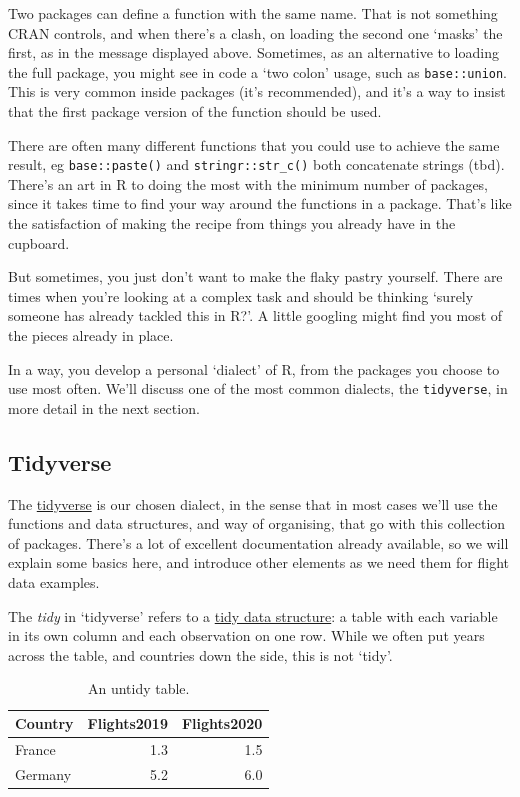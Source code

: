 \documentclass[
]{book}
\begin{document}
Two packages can define a function with the same name. That is not something CRAN controls, and when there's a clash, on loading the second one `masks' the first, as in the message displayed above. Sometimes, as an alternative to loading the full package, you might see in code a `two colon' usage, such as \texttt{base::union}. This is very common inside packages (it's recommended), and it's a way to insist that the first package version of the function should be used.

There are often many different functions that you could use to achieve the same result, eg \texttt{base::paste()} and \texttt{stringr::str\_c()} both concatenate strings (tbd). There's an art in R to doing the most with the minimum number of packages, since it takes time to find your way around the functions in a package. That's like the satisfaction of making the recipe from things you already have in the cupboard.

But sometimes, you just don't want to make the flaky pastry yourself. There are times when you're looking at a complex task and should be thinking `surely someone has already tackled this in R?'. A little googling might find you most of the pieces already in place.

In a way, you develop a personal `dialect' of R, from the packages you choose to use most often. We'll discuss one of the most common dialects, the \texttt{tidyverse}, in more detail in the next section.

\hypertarget{tidyverse}{%
\subsection{Tidyverse}\label{tidyverse}}

The \href{https://www.tidyverse.org}{tidyverse} is our chosen dialect, in the sense that in most cases we'll use the functions and data structures, and way of organising, that go with this collection of packages. There's a lot of excellent documentation already available, so we will explain some basics here, and introduce other elements as we need them for flight data examples.

The \emph{tidy} in `tidyverse' refers to a \href{https://r4ds.had.co.nz/tidy-data.html}{tidy data structure}: a table with each variable in its own column and each observation on one row. While we often put years across the table, and countries down the side, this is not `tidy'.

\begin{table}

\caption{\label{tab:twotables}An untidy table.}
\centering
\begin{tabular}[t]{lrr}
\toprule
Country & Flights2019 & Flights2020\\
\midrule
France & 1.3 & 1.5\\
Germany & 5.2 & 6.0\\
\bottomrule
\end{tabular}
\end{table}
\end{document}
